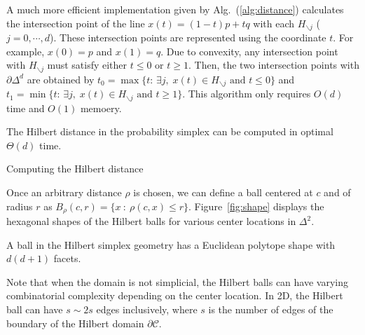\documentclass[graybox]{svmult}
\def\calC{\mathcal{C}}
\begin{document}
A much more efficient implementation given by Alg.~(\ref{alg:distance}) calculates
the intersection point of the line $x(t)=(1-t)p+tq$ with each $H_{\backslash{}j}$ ($j=0,\cdots,d$).
These intersection points are represented using the coordinate $t$.
For example, $x(0)=p$ and $x(1)=q$. Due to convexity,
any intersection point with $H_{\backslash{}j}$ must satisfy either $t\le0$ or $t\ge1$.
Then, the two intersection points with $\partial\Delta^d$ are obtained by 
$t_0=\max\{t:\,\exists{j},\;x(t)\in{H}_{\backslash{j}}\text{ and }t\le0\}$ and
$t_1=\min\{t:\,\exists{j},\;x(t)\in{H}_{\backslash{j}}\text{ and }t\ge1\}$.
This algorithm only requires $O(d)$ time and $O(1)$ memoery.

\begin{lemma}
The Hilbert distance in the probability simplex can be computed in optimal $\Theta(d)$ time.
\end{lemma}

\begin{algorithm}[t]
\caption{Computing the Hilbert distance}\label{alg:distance}
\end{algorithm}

Once an arbitrary distance $\rho$ is chosen, we can define a ball centered
at $c$ and of radius $r$ as $B_\rho(c,r)=\{x\ :\ \rho(c,x)\leq r\}$.
Figure~\ref{fig:shape} displays the hexagonal shapes of the Hilbert balls for various center locations in $\Delta^2$.

\begin{theorem}
A ball in the Hilbert simplex geometry has a Euclidean polytope shape with $d(d+1)$ facets.
\end{theorem}
Note that when the domain is not simplicial, the Hilbert balls can have varying combinatorial complexity depending on the center location.
In 2D, the Hilbert ball can have $s\sim{}2s$ edges inclusively, where $s$ is the number of edges of the boundary of the Hilbert domain $\partial\calC$.
\end{document}
